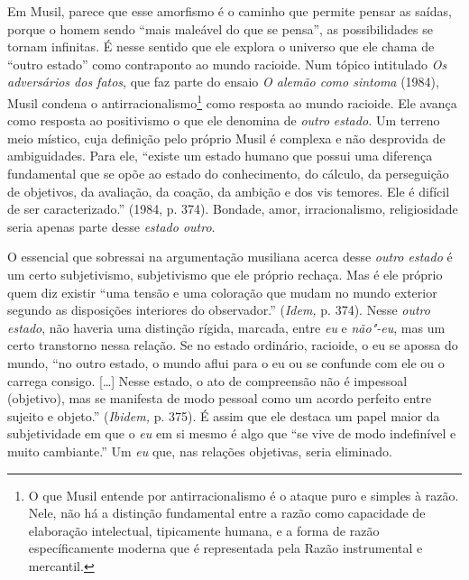 Em Musil, parece que esse amorfismo é o caminho que permite pensar as
saídas, porque o homem sendo ``mais maleável do que se pensa'', as
possibilidades se tornam infinitas. É nesse sentido que ele explora o
universo que ele chama de ``outro estado'' como contraponto ao mundo
racioide. Num tópico intitulado \emph{Os adversários dos fatos}, que faz
parte do ensaio \emph{O alemão como sintoma} (1984), Musil condena o
antirracionalismo\footnote{O que Musil entende por antirracionalismo é o
  ataque puro e simples à razão. Nele, não há a distinção fundamental
  entre a razão como capacidade de elaboração intelectual, tipicamente
  humana, e a forma de razão específicamente moderna que é representada
  pela Razão instrumental e mercantil.} como resposta ao mundo racioide.
Ele avança como resposta ao positivismo o que ele denomina de
\emph{outro} \emph{estado.} Um terreno meio místico, cuja definição pelo
próprio Musil é complexa e não desprovida de ambiguidades. Para ele,
``existe um estado humano que possui uma diferença fundamental que se
opõe ao estado do conhecimento, do cálculo, da perseguição de objetivos,
da avaliação, da coação, da ambição e dos vis temores. Ele é difícil de
ser caracterizado.'' (1984, p. 374). Bondade, amor, irracionalismo,
religiosidade seria apenas parte desse \emph{estado outro}.

O essencial que sobressai na argumentação musiliana acerca desse
\emph{outro estado} é um certo subjetivismo, subjetivismo que ele
próprio rechaça. Mas é ele próprio quem diz existir ``uma tensão e uma
coloração que mudam no mundo exterior segundo as disposições interiores
do observador.'' (\emph{Idem,} p. 374). Nesse \emph{outro estado}, não haveria
uma distinção rígida, marcada, entre \emph{eu} e \emph{não"-eu}, mas um
certo transtorno nessa relação. Se no estado ordinário, racioide, o eu
se apossa do mundo, ``no outro estado, o mundo aflui para o eu ou se
confunde com ele ou o carrega consigo. [\ldots{}] Nesse estado, o
ato de compreensão não é impessoal (objetivo), mas se manifesta de modo
pessoal como um acordo perfeito entre sujeito e objeto.'' (\emph{Ibidem,}
p. 375). É assim que ele destaca um papel maior da subjetividade em que
o \emph{eu} em si mesmo é algo que ``se vive de modo indefinível e muito
cambiante.'' Um \emph{eu} que, nas relações objetivas, seria eliminado.

